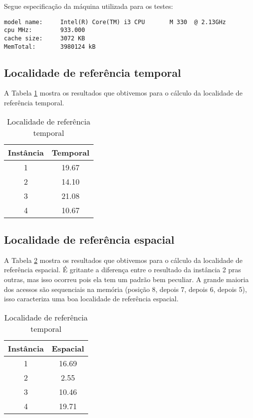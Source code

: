 \documentclass[12pt]{article}
\begin{document}
Segue especificação da máquina utilizada para os testes:
\begin{verbatim}
model name:     Intel(R) Core(TM) i3 CPU       M 330  @ 2.13GHz
cpu MHz:        933.000
cache size:     3072 KB
MemTotal:       3980124 kB
\end{verbatim}


\subsection{Localidade de referência temporal}
\label{loc_ref_temp}

A Tabela \ref{tab_ref_temp} mostra os resultados que obtivemos para o cálculo da localidade de referência temporal.

\begin{table}[h!]
\centering
\begin{footnotesize}
\begin{tabular}{|c|c|}
\hline
\textbf{Instância}  & \textbf{Temporal}  \\ \hline
1 & 19.67 \\ \hline
2 & 14.10 \\ \hline
3 & 21.08 \\ \hline
4 & 10.67 \\ \hline

\end{tabular}
\end{footnotesize}
\caption{Localidade de referência temporal \label{tab_ref_temp}}
\end{table}


\subsection{Localidade de referência espacial}
\label{loc_ref_esp}

A Tabela \ref{tab_ref_esp} mostra os resultados que obtivemos para o cálculo da localidade de referência espacial. É gritante a diferença entre o resultado da instância 2 pras outras, mas isso ocorreu pois ela tem um padrão bem peculiar. A grande maioria dos acessos são sequenciais na memória (posição 8, depois 7, depois 6, depois 5), isso caracteriza uma boa localidade de referência espacial.


\begin{table}[h!]
\centering
\begin{footnotesize}
\begin{tabular}{|c|c|}
\hline
\textbf{Instância}  & \textbf{Espacial}  \\ \hline
1 &  16.69\\ \hline
2 & 2.55\\ \hline
3 &  10.46\\ \hline
4 &  19.71\\ \hline

\end{tabular}
\end{footnotesize}
\caption{Localidade de referência temporal \label{tab_ref_esp}}
\end{table}
\end{document}
